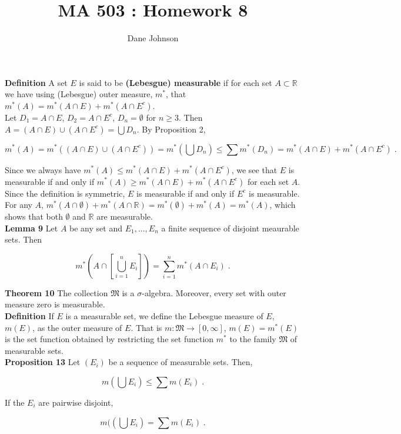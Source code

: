 \documentclass[a4paper]{article}
\title{MA 503 : Homework 8}
\author{Dane Johnson}
\begin{document}
\maketitle


{\bf Definition} A set $E$ is said to be {\bf (Lebesgue) measurable} if for each set $A\subset \mathbb{R}$ we have using (Lebesgue) outer measure, $m^*$, that $m^*(A) = m^*(A\cap E) + m^*(A \cap E^c)$. \\

Let $D_1 = A\cap E$, $D_2 = A\cap E^c$, $D_n = \emptyset$ for $n \geq 3$. Then $A = (A\cap E)\cup (A\cap E^c) = \bigcup D_n$. By Proposition 2,

$$m^*(A) = m^*\left((A\cap E)\cup (A\cap E^c)\right) = m^*\left(\bigcup D_n \right)  \leq \sum m^*(D_n) = m^*(A\cap E) + m^*(A\cap E^c) \;.$$

Since we always have $m^*(A) \leq m^*(A\cap E) + m^*(A\cap E^c)$, we see that $E$ is measurable if and only if $m^*(A) \geq m^*(A\cap E) + m^*(A\cap E^c)$ for each set $A$. Since the definition is symmetric, $E$ is measurable if and only if $E^c$ is measurable. For any $A$, $m^*(A\cap \emptyset) + m^*(A\cap \mathbb{R}) = m^*(\emptyset) + m^*(A) = m^*(A)$, which shows that both $\emptyset$ and $\mathbb{R}$ are measurable. \\


{\bf Lemma 9} Let $A$ be any set and $E_1,..., E_n$ a finite sequence of disjoint meaurable sets. Then 

$$m^*\left(A\cap \left[\bigcup_{i=1}^n E_i\right]\right) =\sum_{i=1}^n m^*(A\cap E_i) \;. $$

{\bf Theorem 10} The collection $\mathfrak{M}$ is a $\sigma$-algebra. Moreover, every set with outer measure zero is measurable.\\

{\bf Definition} If $E$ is a measurable set, we define the Lebesgue measure of $E$, $m(E)$, as the outer measure of $E$. That is $m : \mathfrak{M} \rightarrow [0,\infty]$, $m(E) = m^*(E)$ is the set function obtained by restricting the set function $m^*$ to the family $\mathfrak{M}$ of measurable sets. \\

{\bf Proposition 13} Let $(E_i)$ be a sequence of measurable sets. Then,

$$m\left(\bigcup E_i\right) \leq \sum m(E_i) \;.$$

If the $E_i$ are pairwise disjoint,

$$m(\left(\bigcup E_i \right) = \sum m(E_i) \;.$$
\end{document}
